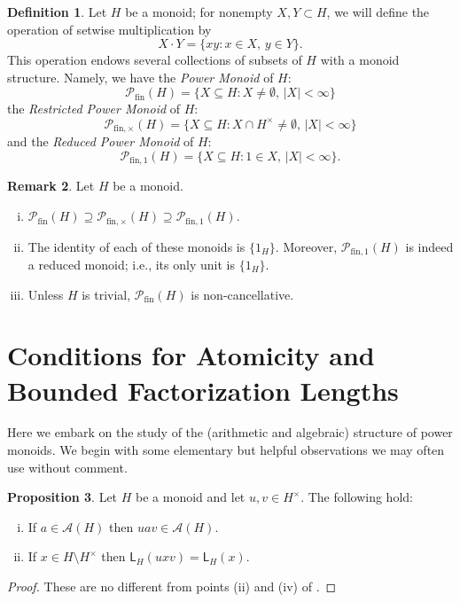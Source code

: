 \documentclass{report}
\renewcommand{\P}{\mathcal{P}}
\newcommand{\fin}{\textrm{fin}}
\newcommand{\funt}{{\textrm{fin}, \times}}
\newcommand{\fun}{{\textrm{fin}, 1}}
\renewcommand{\:}{\text{:}}
\theoremstyle{definition}
\newtheorem{defn}{Definition}[section]
\newtheorem{prop}[defn]{Proposition}
\newtheorem{rk}[defn]{Remark}
\begin{document}
\begin{defn}
Let $H$ be a monoid; for nonempty $X,Y\subset H$, we will define the operation of setwise multiplication by
\[X \cdot Y = \{xy : x\in X,\, y\in Y \}. \]
This operation endows several collections of subsets of $H$ with a monoid structure.  
Namely, we have the \textit{Power Monoid} of $H$:
\[ \P_\fin(H) = \{ X \subseteq H: X\neq \emptyset,\, |X| < \infty \}\]
the \textit{Restricted Power Monoid} of $H$:
\[ \P_\funt(H) = \{ X \subseteq H: X \cap H^\times \neq \emptyset,\,|X| < \infty \} \]
and the \textit{Reduced Power Monoid} of $H$:
\[ \P_\fun(H) = \{ X \subseteq H: 1\in X, \,  |X| < \infty \}. \]
\end{defn}

\begin{rk} Let $H$ be a monoid.
\begin{enumerate}[(i)] 
\item $\P_\fin(H) \supseteq \P_\funt(H) \supseteq \P_\fun(H)$.
\item The identity of each of these monoids is $\{1_H\}$.
Moreover, $\P_\fun(H)$ is indeed a reduced monoid; i.e., its only unit is $\{1_H\}$.
\item Unless $H$ is trivial, $\P_\fin(H)$ is non-cancellative.
\end{enumerate}
\end{rk}

\section{Conditions for Atomicity and Bounded Factorization Lengths} \label{sec:boundaries}



Here we embark on the study of the (arithmetic and algebraic) structure of power monoids.
We begin with some elementary but helpful observations we may often use without comment.
%
\begin{prop}\label{prop:unit-adjust}
Let $H$ be a monoid and let $u,v\in H^\times$.  
The following hold:
\begin{enumerate}[(i)]
\item\label{prop:unit-adjust(i)} If $a\in \mathscr{A}(H)$ then $uav\in \mathscr{A}(H)$.
\item\label{prop:unit-adjust(ii)} If $x\in H\setminus H^\times$ then $\mathsf{L}_H(uxv) = \mathsf{L}_H(x)$.
\end{enumerate}
\end{prop}
%
\begin{proof}
These are no different from points (ii) and (iv) of \cite[Lemma 2.2]{fan-tringali18}.
\end{proof}
\end{document}
